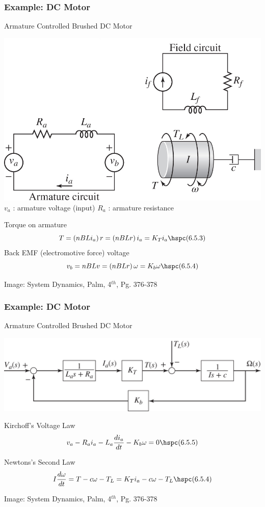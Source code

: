 \documentclass{beamer}                  %
\newcommand{\sectiontitleII}{Example: DC Motor}
\begin{document}
	\begin{frame}[label=sectionII,containsverbatim] \small
        \frametitle{\sectiontitleII}
		Armature Controlled Brushed DC Motor \vspc

		\begin{multicols}{2}

		\includegraphics[scale=.70]{paL40056_06_05_04_cropped.png}\vspace{5mm}\\


		\small
		$v_a$ : armature voltage (input)\vspc
        $R_a$ : armature resistance

        Torque on armature
        \[T=\left(nBLi_a \right)r=\left(nBLr\right)i_a=K_Ti_a \hspc (6.5.3) \] 
        Back EMF (electromotive force) voltage
        \[v_b=nBLv=\left(nBLr\right)\omega=K_b\omega \hspc (6.5.4)\]	

        \end{multicols}

		\btVFill
		\tiny{Image: System Dynamics, Palm, 4$^{th}$, Pg. 376-378}
		
	\end{frame}

	\begin{frame}[label=sectionII,containsverbatim] \small
        \frametitle{\sectiontitleII}
		Armature Controlled Brushed DC Motor \vspc

		\includegraphics[scale=.65]{paL40056_06_05_05_cropped.png}

        Kirchoff's Voltage Law 
        \[ v_a-R_ai_a-L_a\frac{di_a}{dt}-K_b\omega=0 \hspc (6.5.5)\] 

        Newtons's Second Law  
        \[ I\frac{d\omega}{dt}=T-c\omega-T_L=K_Ti_a-c\omega-T_L\hspc (6.5.4)\]	

		\btVFill
		\tiny{Image: System Dynamics, Palm, 4$^{th}$, Pg. 376-378}
		
	\end{frame}	
\end{document}
